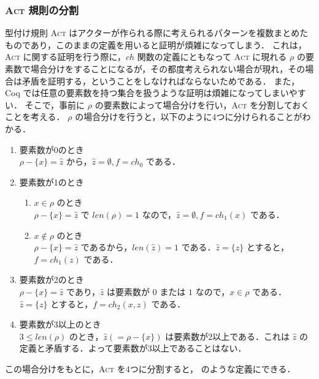 \subsubsection{\textsc{Act} 規則の分割}

型付け規則 \textsc{Act} はアクターが作られる際に考えられるパターンを複数まとめたものであり，このままの定義を用いると証明が煩雑になってしまう．
これは，\textsc{Act} に関する証明を行う際に，$ch$ 関数の定義にともなって \textsc{Act} に現れる $\rho$ の要素数で場合分けをすることになるが，その都度考えられない場合が現れ，その場合は矛盾を証明する，ということをしなければならないためである．
また，Coq では任意の要素数を持つ集合を扱うような証明は煩雑になってしまいやすい．
そこで，事前に $\rho$ の要素数によって場合分けを行い，\textsc{Act} を分割しておくことを考える．
$\rho$ の場合分けを行うと，以下のように4つに分けられることがわかる．

\begin{enumerate}
  \item 要素数が0のとき \\
    $\rho - \{x\} = \hat{z}$ から，$\hat{z} = \emptyset, f = ch_0$ である．
  \item 要素数が1のとき
    \begin{enumerate}
      \item $x \in \rho$ のとき \\
        $\rho - \{x\} = \hat{z}$ で $len(\rho) = 1$ なので，$\hat{z} = \emptyset, f = ch_1(x)$ である．
      \item $x \notin \rho$ のとき \\
        $\rho - \{x\} = \hat{z}$ であるから，$len(\hat{z}) = 1$ である．$\hat{z} = \{z\}$ とすると，$f = ch_1(z)$ である．
    \end{enumerate}
  \item 要素数が2のとき \\
    $\rho - \{x\} = \hat{z}$ であり，$\hat{z}$ は要素数が $0$ または $1$ なので，$x \in \rho$ である．$\hat{z} = \{z\}$ とすると，$f = ch_2(x,z)$ である．
  \item 要素数が3以上のとき \\
    $3 \leq len(\rho)$ のとき，$\hat{z} (= \rho - \{x\})$ は要素数が2以上である．これは $\hat{z}$ の定義と矛盾する．よって要素数が3以上であることはない．
\end{enumerate}


この場合分けをもとに，\textsc{Act} を4つに分割すると， のような定義にできる．

